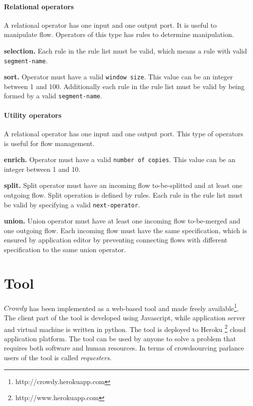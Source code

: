 \subsubsection{Relational operators}
A relational operator has one input and one output port. It is useful to manipulate flow. 
Operators of this type has rules to determine manipulation.

\textbf{selection.}
Each rule in the rule list must be valid, which means a rule with valid \texttt{segment-name}.

\textbf{sort.}
Operator must have a valid \texttt{window size}. This value can be an integer between 
1 and 100. Additionally each rule in the rule list must be valid by being formed by a valid 
\texttt{segment-name}.

\subsubsection{Utility operators}
A relational operator has one input and one output port. This type of operators is useful for 
flow management.

\textbf{enrich.}
Operator must have a valid \texttt{number of copies}. This value can be an integer between 
1 and 10.

\textbf{split.}
Split operator must have an incoming flow to-be-splitted and at least one outgoing flow. 
Split operation is defined by rules. Each rule in the rule list must be valid by specifying 
a valid \texttt{next-operator}.

\textbf{union.}
Union operator must have at least one incoming flow to-be-merged and one outgoing flow. 
Each incoming flow must have the same specification, which is ensured by application editor 
by preventing connecting flows with different specification to the same union operator.



\chapter{Tool}
\label{sec:tool}
$Crowdy$ has been implemented as a web-based tool and made freely 
available\footnote{http://crowdy.herokuapp.com}. The 
client part of the tool is developed using Javascript, while application server and 
virtual machine is written in python. The tool is deployed to Heroku 
\footnote{http://www.herokuapp.com} cloud application 
platform. The tool can be used by anyone to solve a problem that requires both 
software and human resources. In terms of crowdsourcing parlance users of the tool 
is called \textit{requesters}.

